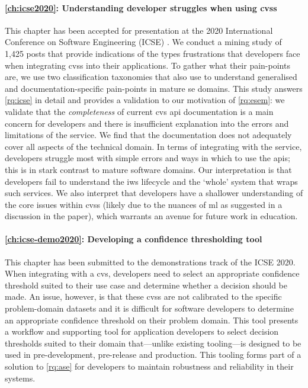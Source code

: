 \paragraph{\cref{ch:icse2020}: Understanding developer struggles when using \glspl{cvs}} This chapter has been accepted for presentation at the 2020 International Conference on Software Engineering (ICSE) \citep{Cummaudo:2019vi}. We conduct a mining study of 1,425  posts that provide indications of the types frustrations that developers face when integrating \glspl{cvs} into their applications. To gather what their pain-points are, we use two classification taxonomies that also use  to understand generalised and documentation-specific pain-points in mature \gls{se} domains. This study answers \ref{rq:icse} in detail and provides a validation to our motivation of \ref{rq:esem}: we validate that the \textit{completeness} of current \gls{cvs} \gls{api} documentation is a main concern for developers and there is insufficient explanation into the errors and limitations of the service. We find that the documentation does not adequately cover all aspects of the technical domain. In terms of integrating with the service, developers struggle most with simple errors and ways in which to use the \glspl{api}; this is in stark contrast to mature software domains. Our interpretation is that developers fail to understand the \gls{iws} lifecycle and the `whole' system that wraps such services. We also interpret that developers have a shallower understanding of the core issues within \glspl{cvs} (likely due to the nuances of \gls{ml} as suggested in a discussion in the paper), which warrants an avenue for future work in  education.

\paragraph{\cref{ch:icse-demo2020}: Developing a confidence thresholding tool} This chapter has been submitted to the demonstrations track of the ICSE 2020. When integrating with a \gls{cvs}, developers need to select an appropriate confidence threshold suited to their use case and determine whether a decision should be made. An issue, however, is that these \glspl{cvs} are not calibrated to the specific problem-domain datasets and it is difficult for software developers to determine an appropriate confidence threshold on their problem domain. This tool presents a workflow and supporting tool for application developers to select decision thresholds suited to their domain that---unlike existing tooling---is designed to be used in pre-development, pre-release and production. This tooling forms part of a solution to \ref{rq:ase} for developers to maintain robustness and reliability in their systems.


